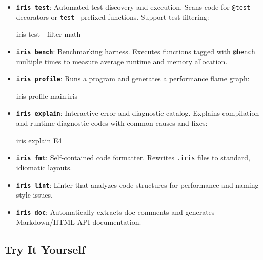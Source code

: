 \documentclass[
  english,
]{book}
\newenvironment{Shaded}{\begin{snugshade}}{\end{snugshade}}
\newcommand{\AttributeTok}[1]{\textcolor[rgb]{0.83,0.83,0.83}{#1}}
\newcommand{\ExtensionTok}[1]{\textcolor[rgb]{0.83,0.83,0.83}{#1}}
\newcommand{\NormalTok}[1]{\textcolor[rgb]{0.83,0.83,0.83}{#1}}
\begin{document}
\begin{itemize}
\item
  \textbf{\texttt{iris\ test}}: Automated test discovery and execution.
  Scans code for \texttt{@test} decorators or \texttt{test\_} prefixed
  functions. Support test filtering:

\begin{Shaded}
\begin{Highlighting}[]
\ExtensionTok{iris}\NormalTok{ test }\AttributeTok{{-}{-}filter}\NormalTok{ math}
\end{Highlighting}
\end{Shaded}
\item
  \textbf{\texttt{iris\ bench}}: Benchmarking harness. Executes
  functions tagged with \texttt{@bench} multiple times to measure
  average runtime and memory allocation.
\item
  \textbf{\texttt{iris\ profile}}: Runs a program and generates a
  performance flame graph:

\begin{Shaded}
\begin{Highlighting}[]
\ExtensionTok{iris}\NormalTok{ profile main.iris}
\end{Highlighting}
\end{Shaded}
\item
  \textbf{\texttt{iris\ explain}}: Interactive error and diagnostic
  catalog. Explains compilation and runtime diagnostic codes with common
  causes and fixes:

\begin{Shaded}
\begin{Highlighting}[]
\ExtensionTok{iris}\NormalTok{ explain E4}
\end{Highlighting}
\end{Shaded}
\item
  \textbf{\texttt{iris\ fmt}}: Self-contained code formatter. Rewrites
  \texttt{.iris} files to standard, idiomatic layouts.
\item
  \textbf{\texttt{iris\ lint}}: Linter that analyzes code structures for
  performance and naming style issues.
\item
  \textbf{\texttt{iris\ doc}}: Automatically extracts doc comments and
  generates Markdown/HTML API documentation.
\end{itemize}

\subsection{Try It Yourself}\label{try-it-yourself-14}
\end{document}
